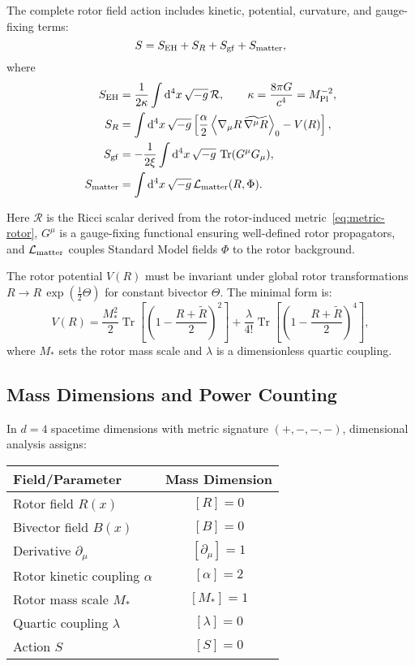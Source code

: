 \documentclass[11pt,a4paper]{article}
\numberwithin{equation}{section}
\theoremstyle{plain}
\theoremstyle{definition}
\theoremstyle{remark}
\DeclareMathOperator{\Tr}{Tr}
\newcommand{\dd}{\mathrm{d}}
\newcommand{\rev}[1]{\widetilde{#1}}        %
\newcommand{\grade}[2]{\left\langle #1 \right\rangle_{#2}}
\newcommand{\Lag}{\mathcal{L}}              %
\begin{document}
The complete rotor field action includes kinetic, potential, curvature, and gauge-fixing terms:
\begin{equation}
S = S_{\rm EH} + S_R + S_{\rm gf} + S_{\rm matter},
\label{eq:action-total}
\end{equation}
where
\begin{align}
S_{\rm EH} &= \frac{1}{2\kappa}\int \dd^4x\,\sqrt{-g}\,\mathcal{R}, \qquad \kappa=\frac{8\pi G}{c^4}=M_{\rm Pl}^{-2}, \label{eq:S-EH}\\
S_R &= \int \dd^4x\,\sqrt{-g}\left[\frac{\alpha}{2}\grade{\nabla_\mu R\,\rev{\nabla^\mu R}}{0} - V(R)\right], \label{eq:S-rotor}\\
S_{\rm gf} &= -\frac{1}{2\xi}\int \dd^4x\,\sqrt{-g}\,\Tr(G^\mu G_\mu), \label{eq:S-gf}\\
S_{\rm matter} &= \int \dd^4x\,\sqrt{-g}\,\Lag_{\rm matter}(R,\Phi). \label{eq:S-matter}
\end{align}

Here $\mathcal{R}$ is the Ricci scalar derived from the rotor-induced metric~\eqref{eq:metric-rotor}, $G^\mu$ is a gauge-fixing functional ensuring well-defined rotor propagators, and $\Lag_{\rm matter}$ couples Standard Model fields $\Phi$ to the rotor background.

The rotor potential $V(R)$ must be invariant under global rotor transformations $R\to R\,\exp(\tfrac12 \Theta)$ for constant bivector $\Theta$. The minimal form is:
\begin{equation}
V(R) = \frac{M_*^2}{2}\Tr\left[\left(1 - \frac{R+\rev{R}}{2}\right)^2\right] + \frac{\lambda}{4!}\Tr\left[\left(1 - \frac{R+\rev{R}}{2}\right)^4\right],
\label{eq:V-rotor}
\end{equation}
where $M_*$ sets the rotor mass scale and $\lambda$ is a dimensionless quartic coupling.

\subsection{Mass Dimensions and Power Counting}

In $d=4$ spacetime dimensions with metric signature $(+,-,-,-)$, dimensional analysis assigns:
\begin{center}
\begin{tabular}{lc}
\toprule
Field/Parameter & Mass Dimension \\
\midrule
Rotor field $R(x)$ & $[R]=0$ \\
Bivector field $B(x)$ & $[B]=0$ \\
Derivative $\partial_\mu$ & $[\partial_\mu]=1$ \\
Rotor kinetic coupling $\alpha$ & $[\alpha]=2$ \\
Rotor mass scale $M_*$ & $[M_*]=1$ \\
Quartic coupling $\lambda$ & $[\lambda]=0$ \\
Action $S$ & $[S]=0$ \\
\bottomrule
\end{tabular}
\end{center}
\end{document}
